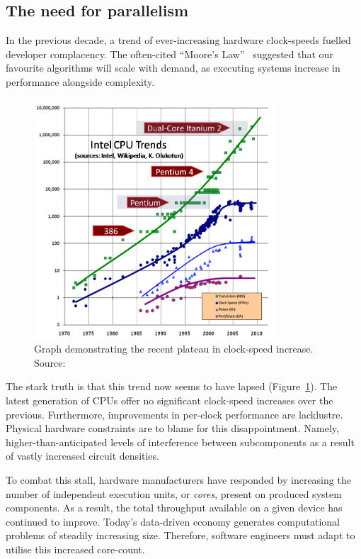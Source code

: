 \subsection{The need for parallelism}

In the previous decade, a trend of ever-increasing hardware clock-speeds fuelled developer complacency.
The often-cited ``Moore's Law''~\cite{moores_law} suggested that our favourite algorithms will scale with demand, as executing systems increase in performance alongside complexity.

\begin{figure}[h]
  \includegraphics[width=0.8\textwidth]{./figures/free_lunch_over.png}
  \caption{Graph demonstrating the recent plateau in clock-speed increase. Source:~\cite{free_lunch_over}}
  \label{fig:free_lunch_over}
\end{figure}

The stark truth is that this trend now seems to have lapsed (Figure~\ref{fig:free_lunch_over}).
The latest generation of \acp{CPU} offer no significant clock-speed increases over the previous. Furthermore, improvements in per-clock performance are lacklustre.
Physical hardware constraints are to blame for this disappointment. Namely, higher-than-anticipated levels of interference between subcomponents as a result of vastly increased circuit densities.

To combat this stall, hardware manufacturers have responded by increasing the number of independent execution units, or \emph{cores}, present on produced system components. As a result, the total throughput available on a given device has continued to improve.
Today's data-driven economy generates computational problems of steadily increasing size. Therefore, software engineers must adapt to utilise this increased core-count.

